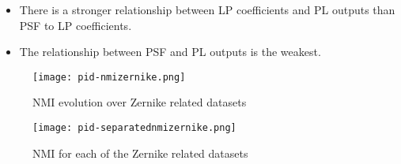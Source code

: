 		\begin{itemize}
			\item There is a stronger relationship between LP coefficients and PL outputs than PSF to LP coefficients.
			\item The relationship between PSF and PL outputs is the weakest.
			
		\end{itemize}		 
		\begin{figure*}[ht!]
			\centering
			\texttt{[image: pid-nmizernike.png]}
			\caption{NMI evolution over Zernike related datasets}
		\end{figure*}
		
		\begin{figure*}[ht!]
			\centering
			\texttt{[image: pid-separatednmizernike.png]}
			\caption{NMI for each of the Zernike related datasets}
		\end{figure*}